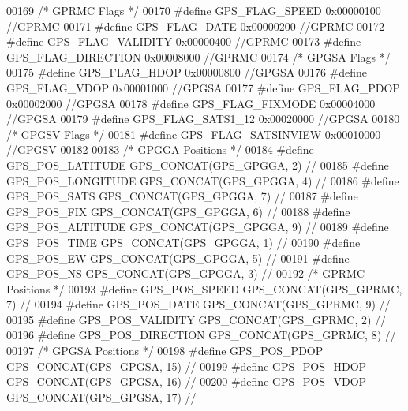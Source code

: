 \begin{DoxyCode}
00169 \textcolor{comment}{/* GPRMC Flags */}
00170 \textcolor{preprocessor}{#define GPS\_FLAG\_SPEED          0x00000100  //GPRMC}
00171 \textcolor{preprocessor}{#define GPS\_FLAG\_DATE           0x00000200  //GPRMC}
00172 \textcolor{preprocessor}{#define GPS\_FLAG\_VALIDITY       0x00000400  //GPRMC}
00173 \textcolor{preprocessor}{#define GPS\_FLAG\_DIRECTION      0x00008000  //GPRMC}
00174 \textcolor{comment}{/* GPGSA Flags */}
00175 \textcolor{preprocessor}{#define GPS\_FLAG\_HDOP           0x00000800  //GPGSA}
00176 \textcolor{preprocessor}{#define GPS\_FLAG\_VDOP           0x00001000  //GPGSA}
00177 \textcolor{preprocessor}{#define GPS\_FLAG\_PDOP           0x00002000  //GPGSA}
00178 \textcolor{preprocessor}{#define GPS\_FLAG\_FIXMODE        0x00004000  //GPGSA}
00179 \textcolor{preprocessor}{#define GPS\_FLAG\_SATS1\_12       0x00020000  //GPGSA}
00180 \textcolor{comment}{/* GPGSV Flags */}
00181 \textcolor{preprocessor}{#define GPS\_FLAG\_SATSINVIEW     0x00010000  //GPGSV}
00182 
00183 \textcolor{comment}{/* GPGGA Positions */}
00184 \textcolor{preprocessor}{#define GPS\_POS\_LATITUDE        GPS\_CONCAT(GPS\_GPGGA, 2)    //}
00185 \textcolor{preprocessor}{#define GPS\_POS\_LONGITUDE       GPS\_CONCAT(GPS\_GPGGA, 4)    //}
00186 \textcolor{preprocessor}{#define GPS\_POS\_SATS            GPS\_CONCAT(GPS\_GPGGA, 7)    //}
00187 \textcolor{preprocessor}{#define GPS\_POS\_FIX             GPS\_CONCAT(GPS\_GPGGA, 6)    //}
00188 \textcolor{preprocessor}{#define GPS\_POS\_ALTITUDE        GPS\_CONCAT(GPS\_GPGGA, 9)    //}
00189 \textcolor{preprocessor}{#define GPS\_POS\_TIME            GPS\_CONCAT(GPS\_GPGGA, 1)    //}
00190 \textcolor{preprocessor}{#define GPS\_POS\_EW              GPS\_CONCAT(GPS\_GPGGA, 5)    //}
00191 \textcolor{preprocessor}{#define GPS\_POS\_NS              GPS\_CONCAT(GPS\_GPGGA, 3)    //}
00192 \textcolor{comment}{/* GPRMC Positions */}
00193 \textcolor{preprocessor}{#define GPS\_POS\_SPEED           GPS\_CONCAT(GPS\_GPRMC, 7)    //}
00194 \textcolor{preprocessor}{#define GPS\_POS\_DATE            GPS\_CONCAT(GPS\_GPRMC, 9)    //}
00195 \textcolor{preprocessor}{#define GPS\_POS\_VALIDITY        GPS\_CONCAT(GPS\_GPRMC, 2)    //}
00196 \textcolor{preprocessor}{#define GPS\_POS\_DIRECTION       GPS\_CONCAT(GPS\_GPRMC, 8)    //}
00197 \textcolor{comment}{/* GPGSA Positions */}
00198 \textcolor{preprocessor}{#define GPS\_POS\_PDOP            GPS\_CONCAT(GPS\_GPGSA, 15)   //}
00199 \textcolor{preprocessor}{#define GPS\_POS\_HDOP            GPS\_CONCAT(GPS\_GPGSA, 16)   //}
00200 \textcolor{preprocessor}{#define GPS\_POS\_VDOP            GPS\_CONCAT(GPS\_GPGSA, 17)   //}

\end{DoxyCode}
